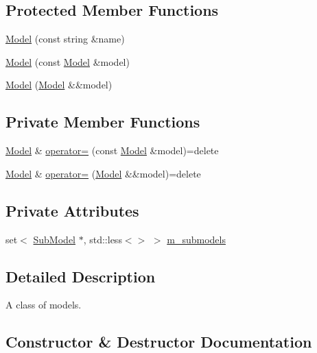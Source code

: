 \subsection*{Protected Member Functions}
\begin{DoxyCompactItemize}
\item 
\hyperlink{classmage_1_1_model_adc37cc2030a93cde5da20f9a941c060e}{Model} (const string \&name)
\item 
\hyperlink{classmage_1_1_model_ac5f1d340bbfefd30bec3e6343a86059a}{Model} (const \hyperlink{classmage_1_1_model}{Model} \&model)
\item 
\hyperlink{classmage_1_1_model_a71abc57cde3bd6270de88bfa3aa47601}{Model} (\hyperlink{classmage_1_1_model}{Model} \&\&model)
\end{DoxyCompactItemize}
\subsection*{Private Member Functions}
\begin{DoxyCompactItemize}
\item 
\hyperlink{classmage_1_1_model}{Model} \& \hyperlink{classmage_1_1_model_a563515c64ec39cfcda9f6ca37576391b}{operator=} (const \hyperlink{classmage_1_1_model}{Model} \&model)=delete
\item 
\hyperlink{classmage_1_1_model}{Model} \& \hyperlink{classmage_1_1_model_a084e30d15822bfefa79128f30a57cc02}{operator=} (\hyperlink{classmage_1_1_model}{Model} \&\&model)=delete
\end{DoxyCompactItemize}
\subsection*{Private Attributes}
\begin{DoxyCompactItemize}
\item 
set$<$ \hyperlink{classmage_1_1_sub_model}{Sub\+Model} $\ast$, std\+::less$<$$>$ $>$ \hyperlink{classmage_1_1_model_a86c68c03650c206afa9c0a0b09a849e3}{m\+\_\+submodels}
\end{DoxyCompactItemize}


\subsection{Detailed Description}
A class of models. 

\subsection{Constructor \& Destructor Documentation}
\hypertarget{classmage_1_1_model_afc6e31cb05ca98c456db56a3e03743d7}{}\label{classmage_1_1_model_afc6e31cb05ca98c456db56a3e03743d7} 
